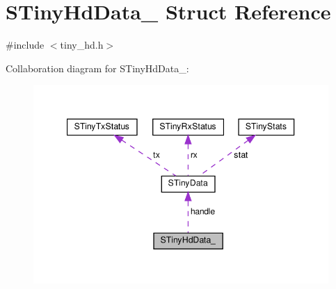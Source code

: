 \hypertarget{structSTinyHdData__}{}\section{S\+Tiny\+Hd\+Data\+\_\+ Struct Reference}
\label{structSTinyHdData__}


{\ttfamily \#include $<$tiny\+\_\+hd.\+h$>$}



Collaboration diagram for S\+Tiny\+Hd\+Data\+\_\+\+:
\nopagebreak
\begin{figure}[H]
\begin{center}
\leavevmode
\includegraphics[width=347pt]{structSTinyHdData____coll__graph}
\end{center}
\end{figure}
